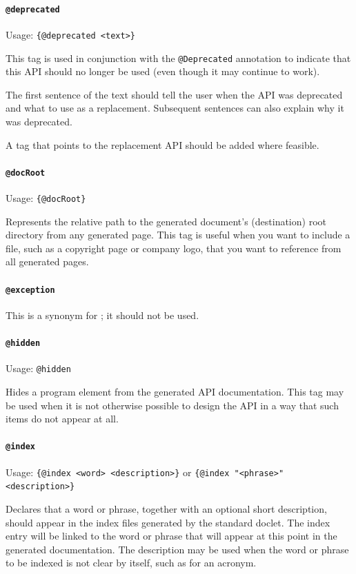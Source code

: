 \documentclass[11pt,a4paper, titlepage, parskip=half, headsepline, footsepline, cleardoublepage=current, headheight=1cm]{scrbook}
\begin{document}
\paragraph{\lstinline|@deprecated|}  Usage: \lstinline|{@deprecated <text>}|

This tag is used in conjunction with the \lstinline|@Deprecated|\autocite{ORACLE_DOC_DEPRECATED_ANNOTATION} annotation to indicate that this API should no longer be used (even though it may continue to work).

The first sentence of the text should tell the user when the API was deprecated and what to use as a replacement. Subsequent sentences can also explain why it was deprecated.

A  tag that points to the replacement API should be added where feasible.

\paragraph{\lstinline|@docRoot|}  Usage: \lstinline|{@docRoot}|

Represents the relative path to the generated document's (destination) root directory from any generated page. This tag is useful when you want to include a file, such as a copyright page or company logo, that you want to reference from all generated pages.

\paragraph{\lstinline|@exception|} This is a synonym for ; it should not be used.

\paragraph{\lstinline|@hidden|}  Usage: \lstinline|@hidden|

Hides a program element from the generated API documentation. This tag may be used when it is not otherwise possible to design the API in a way that such items do not appear at all.

\paragraph{\lstinline|@index|}  Usage: \lstinline|{@index <word> <description>}| or \lstinline|{@index "<phrase>" <description>}|

Declares that a word or phrase, together with an optional short description, should appear in the index files generated by the standard doclet. The index entry will be linked to the word or phrase that will appear at this point in the generated documentation. The description may be used when the word or phrase to be indexed is not clear by itself, such as for an acronym.
\end{document}
